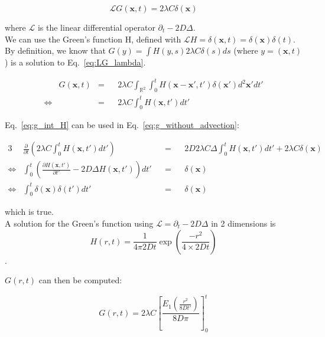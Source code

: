 \begin{equation}
\mathcal{L}G(\boldsymbol{x},t)=2\lambda C\delta(\boldsymbol{x})\label{eq:LG_lambda}
\end{equation}

where $\mathcal{L}$ is the linear differential operator $\partial_{t}-2D\Delta$. \\

We can use the Green's function H, defined with $\mathcal{L}H=\delta(\boldsymbol{x},t)=\delta(\boldsymbol{x})\delta(t)$. \\

By definition, we know that $G(y)=\int H(y,s)2\lambda C\delta(s)ds$
(where $y=(\boldsymbol{x},t)$) is a solution to Eq.~\ref{eq:LG_lambda}.

\begin{align}
 & G(\boldsymbol{x},t) & = & & 2\lambda C\int_{\mathbb{R}^{2}}\int_{0}^{t}H(\boldsymbol{x}-\boldsymbol{x}',t')\delta(\boldsymbol{x}')d^2\boldsymbol{x}'dt'\nonumber \\
\Leftrightarrow &  & = &  & 2\lambda C\int_{0}^{t}H(\boldsymbol{x},t')dt'\label{eq:g_int_H}
\end{align}

Eq.~\ref{eq:g_int_H} can be used in Eq.~\ref{eq:g_without_advection}:

\begin{alignat}{3}
 & \frac{\partial}{\partial t}\left(2\lambda C\int_{0}^{t}H(\boldsymbol{x},t')dt'\right) & & = & & 2D2\lambda C\Delta\int_{0}^{t}H(\boldsymbol{x},t')dt'+2\lambda C\delta(\boldsymbol{x})\\
\Leftrightarrow & \int_{0}^{t}\left(\frac{\partial H(\boldsymbol{x},t')}{\partial t'}-2D\Delta H(\boldsymbol{x},t')\right)dt' & & = & & \delta(\boldsymbol{x})\\
\Leftrightarrow & \int_{0}^{t}\delta(\boldsymbol{x})\delta(t')dt' & & = & & \delta(\boldsymbol{x})
\end{alignat}

which is true. \\

A solution for the Green's function using $\mathcal{L}=\partial_{t}-2D\Delta$
in 2 dimensions is $$H(r,t)=\frac{1}{4\pi2Dt}\exp(\frac{-r^{2}}{4\times2Dt})$$. 

$G(r,t)$ can then be computed:

\begin{equation}
G(r,t)=2\lambda C\left[\frac{E_1 \left(\frac{r^{2}}{8Dt'}\right)}{8D\pi}\right]_{0}^{t}\label{eq:G_r_t}
\end{equation}

